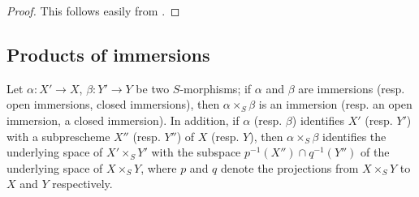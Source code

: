 \begin{proof}
\label{proof-1.4.2.5}
This follows easily from .
\end{proof}

\subsection{Products of immersions}
\label{subsection:products-of-immersions}

\begin{prop}[4.3.1]
\label{1.4.3.1}
Let $\alpha:X'\to X$, $\beta:Y'\to Y$ be two $S$-morphisms;
if $\alpha$ and $\beta$ are immersions (resp. open immersions, closed immersions), then $\alpha\times_S\beta$ is an immersion (resp. an open immersion, a closed immersion).
In addition, if $\alpha$ (resp. $\beta$) identifies $X'$ (resp. $Y'$) with a subprescheme $X''$ (resp. $Y''$) of $X$ (resp. $Y$), then $\alpha\times_S\beta$ identifies the underlying space of $X'\times_S Y'$ with the subspace $p^{-1}(X'')\cap q^{-1}(Y'')$ of the underlying space of $X\times_S Y$, where $p$ and $q$ denote the projections from $X\times_S Y$ to $X$ and $Y$ respectively.
\end{prop}

